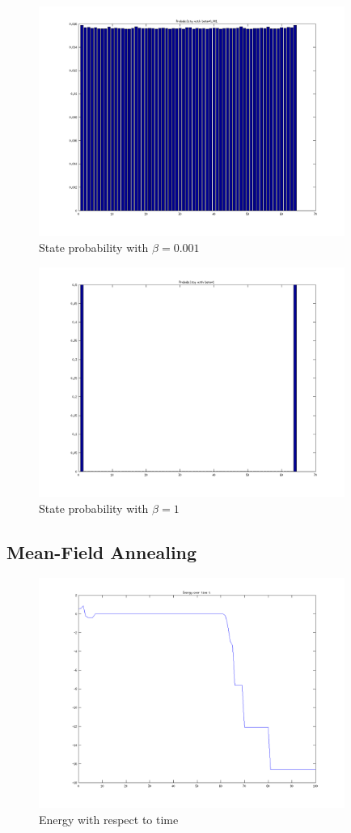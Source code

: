 \documentclass{article}
\begin{document}
		\begin{figure}[H]
			\includegraphics[width=10cm]{prob1.png}
			\caption{State probability with $\beta=0.001$}
		\end{figure}
		\begin{figure}[H]
			\includegraphics[width=10cm]{prob2.png}
			\caption{State probability with $\beta=1$}
		\end{figure}
	\subsection{Mean-Field Annealing}
		
		\begin{figure}[H]
			\includegraphics[width=10cm]{energy2.png}
			\caption{Energy with respect to time}		
		\end{figure}	
		
\end{document}

